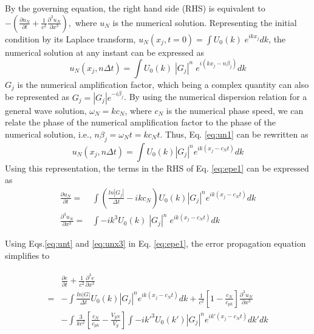 \documentclass{svjour3}                    %
\begin{document}
By the governing equation, the right hand side (RHS) is equivalent to 
$-(\frac{\partial u_N}{\partial t} + \frac{1}{c^2} \frac{\partial^3 u_N}{\partial x^3}),$
where $u_N$ is the numerical solution. Representing the initial condition by its Laplace transform, $ u_N(x_j,t=0) = \int U_0(k)\; e^{i k x_j} dk$, 
the numerical solution at any instant can be expressed as 
\begin{equation}
\label{eq:un1}
u_N(x_j,n\Delta t) = \int U_0(k)\; |G_j|^n\; e^{i(kx_j - n\beta_j)} dk
\end{equation}
$G_j$ is the numerical amplification factor, which being a complex quantity can also be represented as $G_j = |G_j|e^{-i\beta_j}$. By using the 
numerical dispersion relation for a general wave solution, $\omega_N = kc_N$, where $c_N$ is the numerical phase speed, we can relate the phase of 
the numerical amplification factor to the phase of the numerical solution, i.e., $n\beta_j = \omega_N t=kc_Nt$. Thus, Eq. \eqref{eq:un1} can be 
rewritten as
\begin{equation}
\label{eq:un2}
u_N(x_j,n\Delta t) = \int U_0(k) |G_j|^n e^{ik(x_j - c_Nt)} dk
\end{equation}
Using this representation, the terms in the RHS of Eq. \eqref{eq:epe1} can be expressed as
\begin{align}
\label{eq:unt}
\frac{\partial u_N}{\partial t}
  = &\int \left( \frac{ln|G_j|}{\Delta t}  -ikc_N \right)  U_0(k) |G_j|^n e^{ik(x_j - c_Nt)} dk\\
\label{eq:unx3}
\frac{\partial^3 u_N}{\partial x^3}
  = &\int -ik^3 U_0(k)\; |G_j|^n\; e^{ik(x_j - c_Nt)} dk 
\end{align}

Using Eqs.\eqref{eq:unt} and \eqref{eq:unx3} in Eq. \eqref{eq:epe1}, the error propagation equation simplifies to 

\begin{align}
\label{eq:epe2}
\begin{split}
&\frac{\partial e}{\partial t} + \frac{1}{c^2} \frac{\partial^3 e}{\partial x^3} \\
   = &-\int \frac{ln|G|}{\Delta t} U_0(k) |G_j|^n e^{ik(x_j - c_Nt)} dk 
     +\frac{1}{c^2}\left[1-\frac{c_N}{c_{ph}}\right]\frac{\partial^3 u_N}{\partial x^3}\\
     &- \int \frac{3}{kc^2}\left[\frac{c_N}{c_{ph}} - \frac{V_{gN}}{V_g}\right]\int -ik'^3 U_0(k') |G_j|^n e^{ik'(x_j - c_Nt)} dk' dk
     \end{split}
\end{align}
\end{document}

